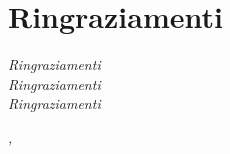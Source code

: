 \cleardoublepage
{}
\thispagestyle{empty}


\begingroup
\let\clearpage\relax
\let\cleardoublepage\relax
\let\cleardoublepage\relax

\section*{Ringraziamenti}


\noindent \textit{Ringraziamenti}\\

\noindent \textit{Ringraziamenti}\\

\noindent \textit{Ringraziamenti}\\
\bigskip

\noindent\textit{\myLocation, \myTime}
\hfill \myName

\endgroup
